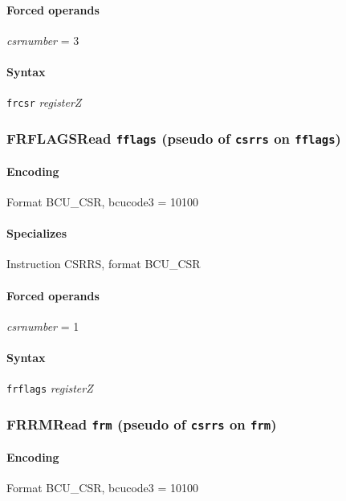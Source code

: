 {\paragraph{Forced operands} \emph{csrnumber} = 3

\paragraph{Syntax} \texttt{frcsr} \emph{registerZ}
\newpage
\subsubsection[{\small FRFLAGS: Read \texttt{fflags} (pseudo of \texttt{csrrs} on \texttt{fflags})}]{FRFLAGS\hfill Read \texttt{fflags} (pseudo of \texttt{csrrs} on \texttt{fflags})}
\label{instr:FRFLAGS}

\paragraph{Encoding} Format \textsf{BCU\_CSR, bcucode3 = 10100}\\



\paragraph{Specializes} Instruction CSRRS, format BCU\_CSR

\paragraph{Forced operands} \emph{csrnumber} = 1

\paragraph{Syntax} \texttt{frflags} \emph{registerZ}
\newpage
\subsubsection[{\small FRRM: Read \texttt{frm} (pseudo of \texttt{csrrs} on \texttt{frm})}]{FRRM\hfill Read \texttt{frm} (pseudo of \texttt{csrrs} on \texttt{frm})}
\label{instr:FRRM}

\paragraph{Encoding} Format \textsf{BCU\_CSR, bcucode3 = 10100}\\

}
